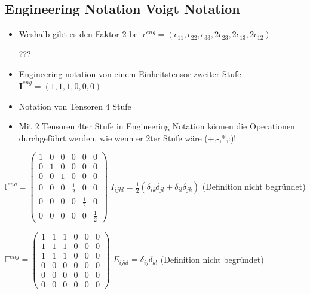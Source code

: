 \documentclass[a4paper]{scrartcl}
\begin{document}
\subsection{Engineering Notation Voigt Notation}
\begin{itemize}
\item Weshalb gibt es den Faktor 2 bei $ \epsilon^{eng}=(\epsilon_{11},\epsilon_{22},\epsilon_{33},2\epsilon_{23},2\epsilon_{13},2\epsilon_{12}) $

???


\item Engineering notation von einem Einheitstensor zweiter Stufe
$ \textbf{I}^{eng}=(1,1,1,0,0,0) $


\item Notation von Tensoren 4 Stufe
\item Mit 2 Tensoren 4ter Stufe in Engineering Notation können die Operationen
durchgeführt werden, wie wenn er 2ter Stufe wäre (+,-,*,:)!

\end{itemize}
$ \mathbb{I}^{eng}=
\begin{pmatrix}
1 & 0 & 0 & 0 & 0 & 0 \\ 
0 & 1 & 0 & 0 & 0 & 0 \\ 
0 & 0 & 1 & 0 & 0 & 0 \\ 
0 & 0 & 0 & \frac{1}{2} & 0 & 0 \\ 
0 & 0 & 0 & 0 & \frac{1}{2} & 0 \\ 
0 & 0 & 0 & 0 & 0 & \frac{1}{2}
\end{pmatrix} 
$ $I_{ijkl} = \frac{1}{2} (\delta_{ik} \delta_{jl} + \delta_{il} \delta_{jk}) $
(Definition nicht begründet)

$
\mathbb{E}^{eng}=
\begin{pmatrix}
1 & 1 & 1 & 0 & 0 & 0 \\ 
1 & 1 & 1 & 0 & 0 & 0 \\ 
1 & 1 & 1 & 0 & 0 & 0 \\ 
0 & 0 & 0 & 0 & 0 & 0 \\ 
0 & 0 & 0 & 0 & 0 & 0 \\ 
0 & 0 & 0 & 0 & 0 & 0
\end{pmatrix} 
$ $E_{ijkl} = \delta_{ij} \delta_{kl}$ (Definition nicht
begründet)
\end{document}
